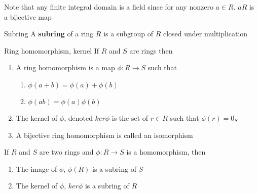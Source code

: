 \documentclass[titlepage, 12pt]{book}
\begin{document}
Note that any finite integral domain is a field since for any nonzero $a\in R$.
$aR$ is a bijective map

\begin{definition}{Subring}{}
    A \textbf{subring} of a ring $R$ is a subgroup of $R$ closed under
    multiplication
\end{definition}

\begin{definition}{Ring homomorphism, kernel}{}
    If $R$ and $S$ are rings then
    \begin{enumerate}
        \item A ring homomorphism is a map $\phi:R\rightarrow S$ such that
        \begin{enumerate}
            \item $\phi(a+b) = \phi(a) + \phi(b)$
            \item $\phi(ab) = \phi(a)\phi(b)$
        \end{enumerate}
        \item The kernel of $\phi$, denoted $ker\phi$ is the set of $r\in R$
            such that $\phi(r) = 0_S$
        \item A bijective ring homomorphism is called an isomorphism
    \end{enumerate}
\end{definition}

\begin{proposition}{}{}
    If $R$ and $S$ are two rings and $\phi:R\rightarrow S$ is a homomorphism,
    then
    \begin{enumerate}
        \item The image of $\phi$, $\phi(R)$ is a subring of $S$
        \item The kernel of $\phi$, $ker\phi$ is a subring of $R$
    \end{enumerate}
\end{proposition}
\end{document}
